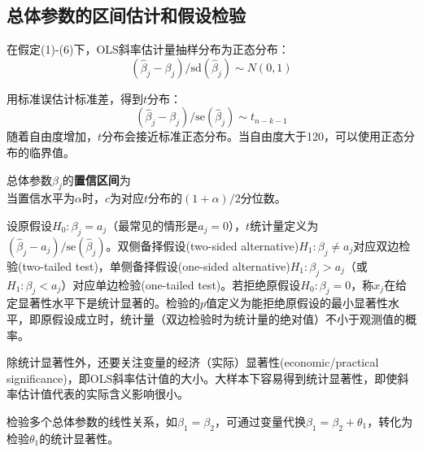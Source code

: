 \subsection{总体参数的区间估计和假设检验}

\par 在假定(1)-(6)下，OLS斜率估计量抽样分布为正态分布：
\begin{equation}
    (\hat{\beta}_j-\beta_j)/\text{sd}(\hat{\beta}_j) \sim N(0, 1)
\end{equation}
\par 用标准误估计标准差，得到$t$分布：
\begin{equation}
    (\hat{\beta}_j-\beta_j)/\text{se}(\hat{\beta}_j) \sim t_{n-k-1}
\end{equation}
随着自由度增加，$t$分布会接近标准正态分布。当自由度大于120，可以使用正态分布的临界值。

\par 总体参数$\beta_j$的\textbf{置信区间}为
\begin{equation}
    [\hat{\beta}_j-c\times \text{se}(\hat{\beta}_j),\hat{\beta}_j+c\times\text{se}(\hat{\beta}_j)]
\end{equation}
当置信水平为$\alpha$时，$c$为对应$t$分布的$(1+\alpha)/2$分位数。

\par 设原假设$H_0: \beta_j=a_j$（最常见的情形是$a_j=0$），$t$统计量定义为$(\hat{\beta}_j-a_j)/\text{se}(\hat{\beta}_j)$。双侧备择假设(two-sided alternative)$H_1: \beta_j\neq a_j$对应双边检验(two-tailed test)，单侧备择假设(one-sided alternative)$H_1: \beta_j > a_j$（或$H_1: \beta_j < a_j$）对应单边检验(one-tailed test)。若拒绝原假设$H_0: \beta_j=0$，称$x_j$在给定显著性水平下是统计显著的。检验的$p$值定义为能拒绝原假设的最小显著性水平，即原假设成立时，统计量（双边检验时为统计量的绝对值）不小于观测值的概率。

\par 除统计显著性外，还要关注变量的经济（实际）显著性(economic/practical significance)，即OLS斜率估计值的大小。大样本下容易得到统计显著性，即使斜率估计值代表的实际含义影响很小。

\par 检验多个总体参数的线性关系，如$\beta_1=\beta_2$，可通过变量代换$\beta_1=\beta_2+\theta_1$，转化为检验$\theta_1$的统计显著性。

